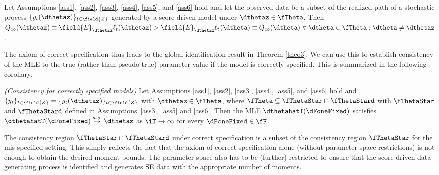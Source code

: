 

\begin{theo} \label{theo3}  
    Let Assumptions \ref{ass1}, \ref{ass2}, \ref{ass3}, \ref{ass4}, \ref{ass5}, and \ref{ass6} 
    hold and let the observed data be a subset of the realized path of a stochastic process $\{y_{t}(\dthetaz)\}_{t \in \field{Z}}$ generated by a score-driven model under $\dthetaz \in \fTheta$. 
    Then $Q_{\infty}(\dthetaz)\equiv \field{E}_{\dthetaz} \ell_{t}(\dthetaz) > \field{E}_{\dthetaz} \ell_{t}(\dtheta) \equiv Q_{\infty}(\dtheta) \ \forall \ \dtheta \in \fTheta : \dtheta \neq \dthetaz$.
\end{theo}

The axiom of correct specification thus leads to the global identification result in Theorem \ref{theo3}.
We can use this to establish consistency of the MLE to the true (rather than pseudo-true) parameter value if the model is correctly specified.
This is summarized in the following corollary.


\begin{cor} \label{cor1}
\emph{(Consistency for correctly specified models)}
    Let Assumptions \ref{ass1}, \ref{ass2}, \ref{ass3}, \ref{ass4}, \ref{ass5}, and \ref{ass6} 
hold and $\{y_{t}\}_{t \in \field{Z}} = \{y_{t}(\dthetaz)\}_{t\in \field{Z}}$ with
$\dthetaz \in \fTheta$, where 
$\fTheta \subseteq \fThetaStar \cap  \fThetaStard$ 
with $\fThetaStar$ and $\fThetaStard$ defined in Assumptions~\ref{ass3}, \ref{ass5} and \ref{ass6}.
Then the MLE $\dthetahatT(\dFoneFixed)$ satisfies  $\dthetahatT(\dFoneFixed) \stackrel{a.s.}{\to}  \dthetaz$ as $\iT \to \infty$ for every $\dFoneFixed \in \fF$. 
\end{cor}


The consistency region $\fThetaStar \cap  \fThetaStard$ under correct specification is a subset of the consistency region $\fThetaStar$ for the mis-specified setting. This simply reflects the fact that the axiom of correct specification alone (without parameter space restrictions) is not enough to obtain the desired moment bounds. The parameter space also has to be (further) restricted to ensure that the score-driven data generating process is identified and generates SE data with the appropriate number of moments. 

